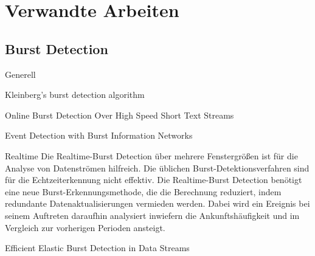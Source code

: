 \section{Verwandte Arbeiten}
\subsection{Burst Detection}
Generell

Kleinberg’s burst detection algorithm

Online Burst Detection Over High Speed Short Text Streams

Event Detection with Burst Information Networks

Realtime
Die Realtime-Burst Detection über mehrere Fenstergrößen ist für die Analyse von Datenströmen hilfreich. Die üblichen Burst-Detektionsverfahren sind für die Echtzeiterkennung nicht effektiv. Die Realtime-Burst Detection benötigt eine neue Burst-Erkennungsmethode, die die Berechnung reduziert, indem redundante Datenaktualisierungen vermieden werden. Dabei wird ein Ereignis bei seinem Auftreten daraufhin analysiert inwiefern die Ankunftshäufigkeit und im Vergleich zur vorherigen Perioden ansteigt.

Efficient Elastic Burst Detection in Data Streams 

\cite{10.1007978-3-642-36973-5_22}